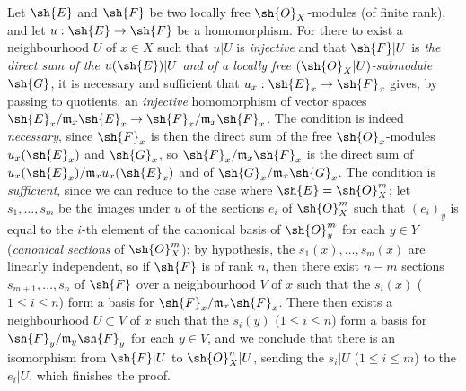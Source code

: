 \begin{env}[5.5.5]
\label{0.5.5.5}
Let $\sh{E}$ and $\sh{F}$ be two locally free $\sh{O}_X$-modules (of finite rank), and let $u:\sh{E}\to\sh{F}$ be a homomorphism.
For there to exist a neighbourhood $U$ of $x\in X$ such that $u|U$ is \emph{injective} and that $\sh{F}|U$ is \emph{the direct sum of the $u(\sh{E})|U$ and of a locally free $(\sh{O}_X|U)$-submodule $\sh{G}$}, it is necessary and sufficient that $u_x:\sh{E}_x\to\sh{F}_x$ gives, by passing to quotients, an \emph{injective} homomorphism of vector spaces $\sh{E}_x/\mathfrak{m}_x\sh{E}_x\to\sh{F}_x/\mathfrak{m}_x\sh{F}_x$.
The condition is indeed \emph{necessary}, since $\sh{F}_x$ is then the direct sum of the free $\sh{O}_x$-modules $u_x(\sh{E}_x)$ and $\sh{G}_x$, so $\sh{F}_x/\mathfrak{m}_x\sh{F}_x$ is the direct sum of $u_x(\sh{E}_x)/\mathfrak{m}_x u_x(\sh{E}_x)$ and of $\sh{G}_x/\mathfrak{m}_x\sh{G}_x$.
The condition is \emph{sufficient}, since we can reduce to the case where $\sh{E}=\sh{O}_X^m$;
let $s_1,\dots,s_m$ be the images under $u$ of the sections $e_i$ of $\sh{O}_X^m$ such that $(e_i)_y$ is equal to the $i$-th element of the canonical basis of $\sh{O}_y^m$ for each $y\in Y$ (\emph{canonical sections} of $\sh{O}_X^m$);
by hypothesis, the $s_1(x),\dots,s_m(x)$ are linearly independent, so if $\sh{F}$ is of rank $n$, then there exist $n-m$ sections $s_{m+1},\dots,s_n$ of $\sh{F}$ over a neighbourhood $V$ of $x$ such that the $s_i(x)$ ($1\leq i\leq n$) form a basis for $\sh{F}_x/\mathfrak{m}_x\sh{F}_x$.
There then exists  a neighbourhood $U\subset V$ of $x$ such that the $s_i(y)$ ($1\leq i\leq n$) form a basis for $\sh{F}_y/\mathfrak{m}_y\sh{F}_y$ for each $y\in V$, and we conclude  that there is an isomorphism from $\sh{F}|U$ to $\sh{O}_X^n|U$, sending the $s_i|U$ ($1\leq i\leq m$) to the $e_i|U$, which finishes the proof.
\end{env}

